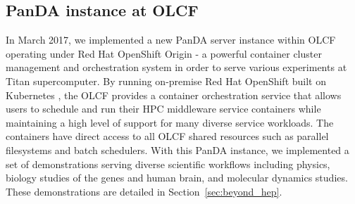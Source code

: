 \subsection{PanDA instance at OLCF}
\label{subsec:panda_instance}

In March 2017, we implemented a new PanDA server instance within OLCF operating
under Red Hat OpenShift Origin \cite{RH_OpenShift} - a powerful container
cluster management and orchestration system in order to serve various
experiments at Titan supercomputer. By running on-premise Red Hat OpenShift
built on Kubernetes \cite{Kubernetes}, the OLCF provides a container
orchestration service that allows users to schedule and run their HPC
middleware service containers while maintaining a high level of support for
many diverse service workloads. The containers have direct access to all OLCF
shared resources such as parallel filesystems and batch schedulers. With this
PanDA instance, we implemented a set of demonstrations serving diverse
scientific workflows including physics, biology studies of the genes and human
brain, and molecular dynamics studies. These demonstrations are detailed in
Section~\ref{sec:beyond_hep}.


